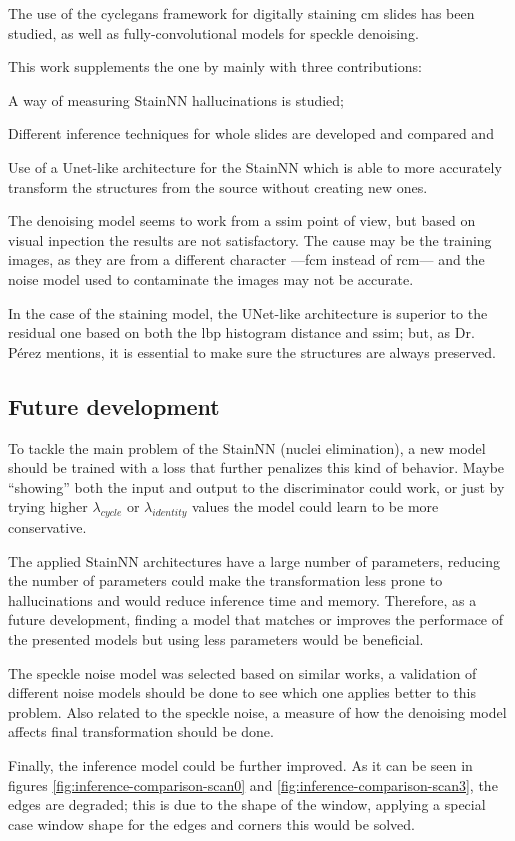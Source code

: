 \documentclass[../main.tex]{subfiles}
\begin{document}
The use of the \gls{cyclegans} framework for digitally staining \gls{cm} slides
has been studied, as well as fully-convolutional models for speckle denoising.

This work supplements the one by \cite{Combalia2019} mainly with three
contributions:
\begin{enumerate*}[label=\arabic*)]
\item A way of measuring StainNN hallucinations is studied;
\item Different inference techniques for whole slides are developed and compared
and
\item Use of a Unet-like architecture for the StainNN which is able to more
accurately transform the structures from the source without creating new ones.
\end{enumerate*}

The denoising model seems to work from a \gls{ssim} point of view, but based on
visual inpection the results are not satisfactory. The cause may be the
training images, as they are from a different character ---\gls{fcm} instead
of \gls{rcm}--- and the noise model used to contaminate the images
may not be accurate.

In the case of the staining model, the UNet-like architecture is superior to the
residual one based on both the \gls{lbp} histogram distance and \gls{ssim}; but,
as Dr. Pérez mentions, it is essential to make sure the structures are always
preserved.

\subsection{Future development}

To tackle the main problem of the StainNN (nuclei elimination), a new model
should be trained with a loss that further penalizes this kind of behavior.
Maybe ``showing'' both the input and output to the discriminator could work,
or just by trying higher $\lambda_{cycle}$ or $\lambda_{identity}$ values
the model could learn to be more conservative.

The applied StainNN architectures have a large number of parameters, reducing
the number of parameters could make the transformation less prone to
hallucinations and would reduce inference time and memory.
Therefore, as a future development, finding a model that matches or improves
the performace of the presented models but using less parameters would
be beneficial.

The speckle noise model was selected based on similar works, a validation of
different noise models should be done to see which one applies better to this
problem. Also related to the speckle noise, a measure of how the denoising model
affects final transformation should be done.

Finally, the inference model could be further improved. As it can be seen in
figures \ref{fig:inference-comparison-scan0} and
\ref{fig:inference-comparison-scan3}, the edges are degraded; this is due to
the shape of the window, applying a special case window shape for the edges
and corners this would be solved.
\end{document}
